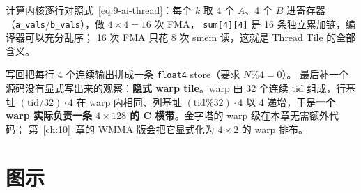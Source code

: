 

计算内核逐行对照式~\ref{eq:9-ai-thread}：每个 $k$ 取 4 个 $A$、4 个 $B$ 进寄存器
（\texttt{a\_vals}/\texttt{b\_vals}），做 $4 \times 4 = 16$ 次 FMA，
\texttt{sum[4][4]} 是 16 条独立累加链，编译器可以充分乱序；
16 次 FMA 只花 8 次 smem 读，这就是 Thread Tile 的全部含义。



写回把每行 4 个连续输出拼成一条 \texttt{float4} store（要求 $N \% 4 = 0$）。
最后补一个源码没有显式写出来的观察：\textbf{隐式 warp tile}。warp 由 32 个连续
tid 组成，行基址 $(\mathrm{tid}/32) \cdot 4$ 在 warp 内相同、列基址
$(\mathrm{tid}\%32) \cdot 4$ 以 4 递增，于是\textbf{一个 warp 实际负责一条
$4 \times 128$ 的 C 横带}。金字塔的 warp 级在本章无需额外代码；
第~\ref{ch:10}~章的 WMMA 版会把它显式化为 $4 \times 2$ 的 warp 排布。

\section{图示}


